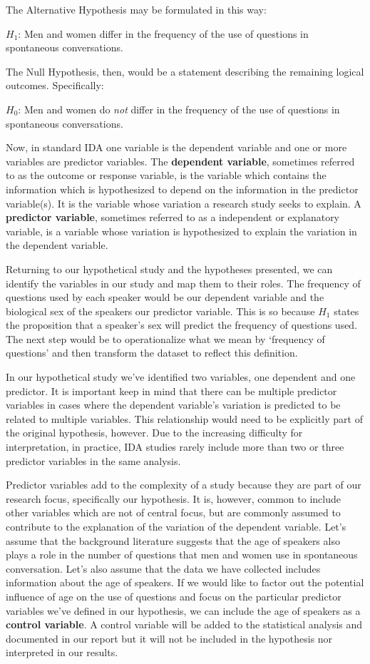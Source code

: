 \documentclass[
  letterpaper,
  DIV=11,
  numbers=noendperiod]{scrreport}
\theoremstyle{definition}
\theoremstyle{remark}
\begin{document}
The Alternative Hypothesis may be formulated in this way:

\(H_1\): Men and women differ in the frequency of the use of questions
in spontaneous conversations.

The Null Hypothesis, then, would be a statement describing the remaining
logical outcomes. Specifically:

\(H_0\): Men and women do \emph{not} differ in the frequency of the use
of questions in spontaneous conversations.

Now, in standard IDA one variable is the dependent variable and one or
more variables are predictor variables. The \textbf{dependent variable},
sometimes referred to as the outcome or response variable, is the
variable which contains the information which is hypothesized to depend
on the information in the predictor variable(s). It is the variable
whose variation a research study seeks to explain. A \textbf{predictor
variable}, sometimes referred to as a independent or explanatory
variable, is a variable whose variation is hypothesized to explain the
variation in the dependent variable.

Returning to our hypothetical study and the hypotheses presented, we can
identify the variables in our study and map them to their roles. The
frequency of questions used by each speaker would be our dependent
variable and the biological sex of the speakers our predictor variable.
This is so because \(H_1\) states the proposition that a speaker's sex
will predict the frequency of questions used. The next step would be to
operationalize what we mean by `frequency of questions' and then
transform the dataset to reflect this definition.

In our hypothetical study we've identified two variables, one dependent
and one predictor. It is important keep in mind that there can be
multiple predictor variables in cases where the dependent variable's
variation is predicted to be related to multiple variables. This
relationship would need to be explicitly part of the original
hypothesis, however. Due to the increasing difficulty for
interpretation, in practice, IDA studies rarely include more than two or
three predictor variables in the same analysis.

Predictor variables add to the complexity of a study because they are
part of our research focus, specifically our hypothesis. It is, however,
common to include other variables which are not of central focus, but
are commonly assumed to contribute to the explanation of the variation
of the dependent variable. Let's assume that the background literature
suggests that the age of speakers also plays a role in the number of
questions that men and women use in spontaneous conversation. Let's also
assume that the data we have collected includes information about the
age of speakers. If we would like to factor out the potential influence
of age on the use of questions and focus on the particular predictor
variables we've defined in our hypothesis, we can include the age of
speakers as a \textbf{control variable}. A control variable will be
added to the statistical analysis and documented in our report but it
will not be included in the hypothesis nor interpreted in our results.
\end{document}
